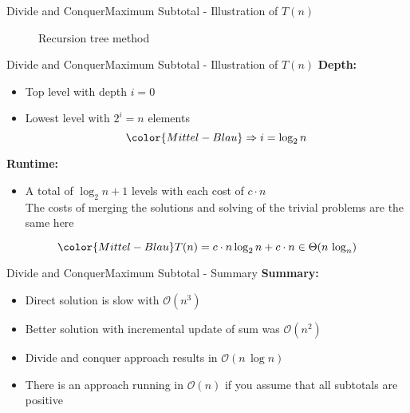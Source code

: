 
\begin{frame}{Divide and Conquer}{Maximum Subtotal - Illustration of $T(n)$}
  \begin{figure}
    \begin{adjustbox}{width=\linewidth}
      
    \end{adjustbox}
    \caption{Recursion tree method}
    \label{fig:divide_and_conquer:max_sub_array_runtime_tree}
  \end{figure}
\end{frame}


\begin{frame}{Divide and Conquer}{Maximum Subtotal - Illustration of $T(n)$}
  \textbf{Depth:}
  \begin{itemize}
    \item
      Top level with depth {\color{Mittel-Blau}$i = 0$}
    \item
      Lowest level with {\color{Mittel-Blau}$2^i = n$} elements
      \begin{displaymath}
        {\color{Mittel-Blau}\Rightarrow i = \log_2 n}
      \end{displaymath}
  \end{itemize}
  \textbf{Runtime:}
  \begin{itemize}
    \item
      A total of {\color{Mittel-Blau}$\log_2 n + 1$} levels with each cost of
      {\color{Mittel-Blau}$c \cdot n$}\\
      \color{gray}
      The costs of merging the solutions and solving of the trivial
      problems are the same here
  \end{itemize}
  \begin{displaymath}
    {\color{Mittel-Blau}
    T(n) = c \cdot n \log_2 n + c \cdot n \in \Theta(n\,\log_n)}
  \end{displaymath}
\end{frame}


\begin{frame}{Divide and Conquer}{Maximum Subtotal - Summary}
  \textbf{Summary:}
  \begin{itemize}
    \item
      Direct solution is slow with {\color{Mittel-Blau}$\mathcal{O}(n^3)$}
    \item
      Better solution with incremental update of sum was
      {\color{Mittel-Blau}$\mathcal{O}(n^2)$}
    \item
      Divide and conquer approach results in
      {\color{Mittel-Blau}$\mathcal{O}(n\,\log n)$}
    \item
      There is an approach running in {\color{Mittel-Blau}$\mathcal{O}(n)$}
      if you assume that all subtotals are positive
  \end{itemize}
\end{frame}